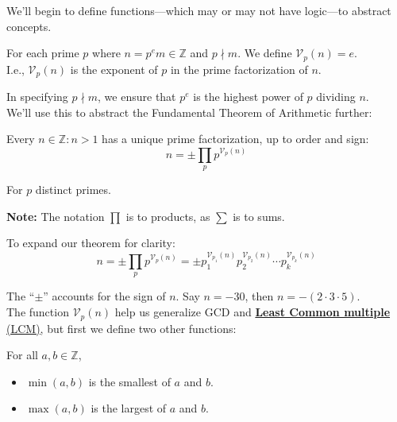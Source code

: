 \newpage
\noindent
We'll begin to define functions---which may or may not have logic---to abstract concepts.
\begin{Func}

    For each prime $p$ where $n=p^em \in\mathbb{Z}$ and $p\nmid m$. We define $\mathcal{V}_p(n)=e$.\\
    I.e., $\mathcal{V}_p(n)$ is the exponent of $p$ in the prime factorization of $n$. 
\end{Func}
In specifying $p\nmid m$, we ensure that $p^e$ is the highest power of $p$ dividing $n$.\\

\noindent
We'll use this to abstract the Fundamental Theorem of Arithmetic further:
\begin{theo}

    \label{theo:FTA_abstracted}

    Every $n\in\mathbb{Z}:n>1$ has a unique prime factorization, up to order and sign:
    \LARGE \[n = \pm \prod_{p} p^{\mathcal{V}_p(n)}\]
    
    \normalsize
    \noindent
    For $p$ distinct primes.
\end{theo}
\begin{Note}
    \textbf{Note:} The notation $\prod$ is to products, as $\sum$ is to sums.
\end{Note}

\noindent
To expand our theorem for clarity:
\LARGE
\[
    n = \pm \prod_{p} p^{\mathcal{V}_p(n)} = \pm p_1^{\mathcal{V}_{p_1}(n)} p_2^{\mathcal{V}_{p_2}(n)} \cdots p_k^{\mathcal{V}_{p_k}(n)}
\]
\normalsize

\noindent
The ``$\pm$'' accounts for the sign of $n$. Say $n=-30$, then $n=-(2\cdot3\cdot5)$.\\

\noindent
The function $\mathcal{V}_p(n)$ help us generalize GCD and \underline{\textbf{Least Common multiple} (LCM),} but first we define two other functions:

\begin{Func}
    
        For all $a,b\in\mathbb{Z}$,
        \begin{itemize}
            \item $\min(a,b)$ is the smallest of $a$ and $b$.
            \item $\max(a,b)$ is the largest of $a$ and $b$.
        \end{itemize}
\end{Func}

